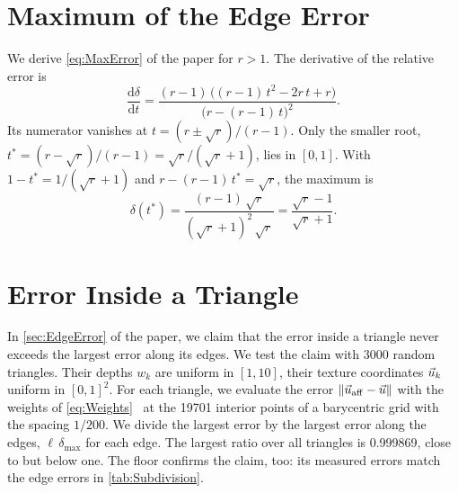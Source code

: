 \section{Maximum of the Edge Error}\label{sec:MaxErrorDerivation}
We derive \cref{eq:MaxError} of the paper for $r > 1$.
The derivative of the relative error is
\begin{equation}
    \frac{\mathrm{d}\delta}{\mathrm{d}t} = \frac{(r - 1)\,\bigl((r - 1)\,t^2 - 2r\,t + r\bigr)}{\bigl(r - (r - 1)\,t\bigr)^2}.
\end{equation}
Its numerator vanishes at $t = (r \pm \sqrt{r})/(r - 1)$.
Only the smaller root, $t^\ast = (r - \sqrt{r})/(r - 1) = \sqrt{r}/(\sqrt{r} + 1)$, lies in $[0, 1]$.
With $1 - t^\ast = 1/(\sqrt{r} + 1)$ and $r - (r - 1)\,t^\ast = \sqrt{r}$, the maximum is
\begin{equation}
    \delta(t^\ast) = \frac{(r - 1)\,\sqrt{r}}{(\sqrt{r} + 1)^2\,\sqrt{r}} = \frac{\sqrt{r} - 1}{\sqrt{r} + 1}.
\end{equation}

\section{Error Inside a Triangle}\label{sec:InteriorError}
In \cref{sec:EdgeError} of the paper, we claim that the error inside a triangle never exceeds the largest error along its edges.
We test the claim with \num{3000} random triangles.
Their depths $w_k$ are uniform in $[1, 10]$, their texture coordinates $\vec{u}_k$ uniform in $[0, 1]^2$.
For each triangle, we evaluate the error $\Vert \vec{u}_\mathrm{aff} - \vec{u} \Vert$ with the weights of \cref{eq:Weights}~\cite{Heckbert91IPT} at the \num{19701} interior points of a barycentric grid with the spacing $1/200$.
We divide the largest error by the largest error along the edges, $\ell\,\delta_\mathrm{max}$ for each edge.
The largest ratio over all triangles is 0.999869, close to but below one.
The floor confirms the claim, too: its measured errors match the edge errors in \cref{tab:Subdivision}.
